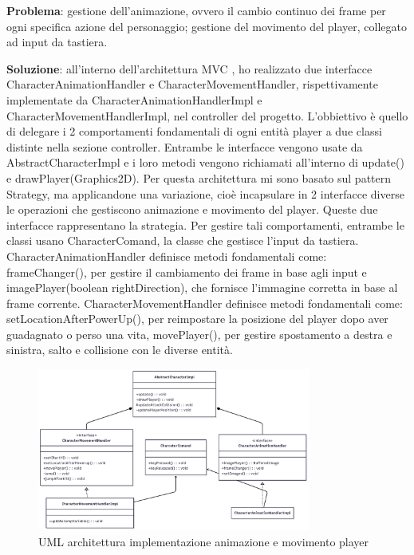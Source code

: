 \documentclass[a4paper,12pt]{report}
\begin{document}
\textbf{Problema}: gestione dell'animazione, ovvero il cambio continuo dei frame per ogni specifica azione del personaggio; 
gestione del movimento del player, collegato ad input da tastiera.

\textbf{Soluzione}: all'interno dell'architettura MVC , ho realizzato due interfacce CharacterAnimationHandler e 
CharacterMovementHandler, rispettivamente implementate da CharacterAnimationHandlerImpl e CharacterMovementHandlerImpl, nel controller 
del progetto. L'obbiettivo è quello di delegare i 2 comportamenti fondamentali di ogni entità player a due classi distinte nella sezione 
controller. Entrambe le interfacce vengono usate da AbstractCharacterImpl e i loro metodi vengono richiamati all'interno di update() 
e drawPlayer(Graphics2D).
Per questa architettura mi sono basato sul pattern Strategy, ma applicandone una variazione, cioè incapsulare in 2 interfacce diverse 
le operazioni che gestiscono animazione e movimento del player. Queste due interfacce rappresentano la strategia. Per gestire 
tali comportamenti, entrambe le classi usano CharacterComand, la classe che gestisce l'input da tastiera.
CharacterAnimationHandler definisce metodi fondamentali come: frameChanger(), per gestire il cambiamento dei frame in base agli input 
e imagePlayer(boolean rightDirection), che fornisce l'immagine corretta in base al frame corrente.
CharacterMovementHandler definisce metodi fondamentali come: setLocationAfterPowerUp(), per reimpostare la posizione del player
dopo aver guadagnato o perso una vita, movePlayer(), per gestire spostamento a destra e sinistra, salto e collisione con le diverse 
entità.

\begin{figure}
    \centering
    \includegraphics[width=0.8\textwidth]{resources/playerAction.png}
    \caption{UML architettura implementazione animazione e movimento player}
    \label{fig:2.2}
\end{figure}
\end{document}
